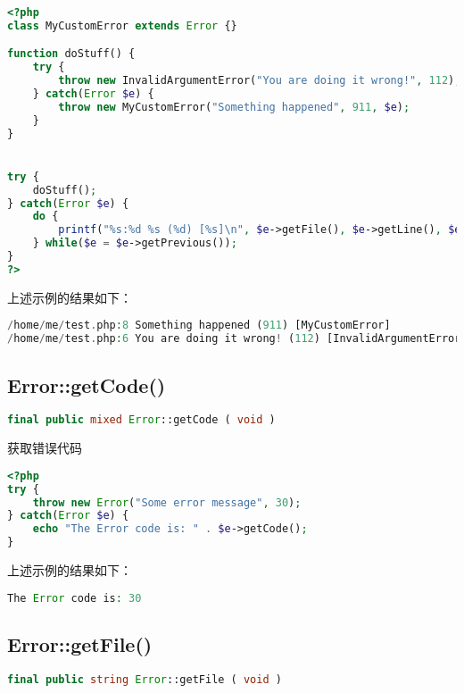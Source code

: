 \begin{lstlisting}[language=PHP]
<?php
class MyCustomError extends Error {}

function doStuff() {
    try {
        throw new InvalidArgumentError("You are doing it wrong!", 112);
    } catch(Error $e) {
        throw new MyCustomError("Something happened", 911, $e);
    }
}


try {
    doStuff();
} catch(Error $e) {
    do {
        printf("%s:%d %s (%d) [%s]\n", $e->getFile(), $e->getLine(), $e->getMessage(), $e->getCode(), get_class($e));
    } while($e = $e->getPrevious());
}
?>
\end{lstlisting}

上述示例的结果如下：


\begin{lstlisting}[language=PHP]
/home/me/test.php:8 Something happened (911) [MyCustomError]
/home/me/test.php:6 You are doing it wrong! (112) [InvalidArgumentError]
\end{lstlisting}

\subsection{Error::getCode()}

\begin{lstlisting}[language=PHP]
final public mixed Error::getCode ( void )
\end{lstlisting}

获取错误代码



\begin{lstlisting}[language=PHP]
<?php
try {
    throw new Error("Some error message", 30);
} catch(Error $e) {
    echo "The Error code is: " . $e->getCode();
}
\end{lstlisting}

上述示例的结果如下：


\begin{lstlisting}[language=PHP]
The Error code is: 30
\end{lstlisting}

\subsection{Error::getFile()}

\begin{lstlisting}[language=PHP]
final public string Error::getFile ( void )
\end{lstlisting}

